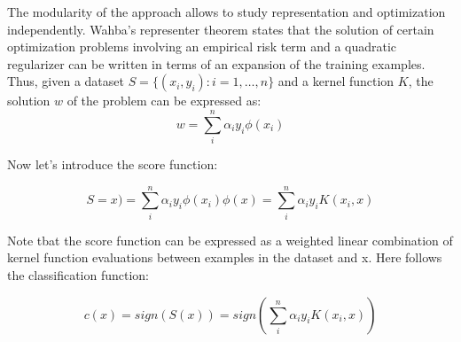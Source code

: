 The modularity of the approach allows to study representation and optimization
independently. Wahba's representer theorem states that the solution of certain
optimization problems involving an empirical risk term and a quadratic
regularizer can be written in terms of an expansion of the training examples.
Thus, given a dataset $S = \{(x_i, y_i): i = 1, \dots, n\}$ and a kernel
function $K$, the solution $w$ of the problem can be expressed as:
\begin{equation}
	w = \sum_i^n \alpha_i y_i \phi(x_i)
\end{equation}

Now let's introduce the score function:

\begin{equation}
	S=x) = \sum_i^n \alpha_i y_i \phi(x_i) \phi(x) = \sum_i^n \alpha_i y_i
	K(x_i, x)
\end{equation}

Note tbat the score function can be expressed as a weighted linear combination
of kernel function evaluations between examples in the dataset and x. Here
follows the classification function:

\begin{equation}
	c(x) = sign(S(x)) = sign \left( \sum_i^n \alpha_i y_i K(x_i, x) \right)
\end{equation}
